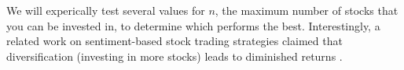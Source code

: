 We will experically test several values for $n$, the maximum number of stocks that you can be invested in, to determine which performs the best.
Interestingly, a related work on sentiment-based stock trading strategies claimed that diversification (investing in more stocks) leads to diminished returns \cite{tradingSentimentPaper}.

